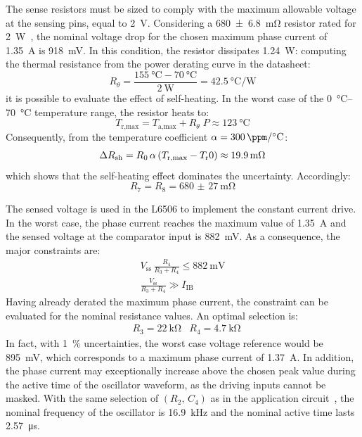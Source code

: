 \documentclass[]{article}
\begin{document}
The sense resistors must be sized to comply with the maximum allowable voltage at the sensing pins, equal to \qty{2}{\V}. Considering a \qty{680(6.8)}{\mohm} resistor rated for \qty{2}{\W}~\cite{rsense}, the nominal voltage drop for the chosen maximum phase current of \qty{1.35}{\A} is \qty{918}{\mV}. In this condition, the resistor dissipates \qty{1.24}{\W}: computing the thermal resistance from the power derating curve in the datasheet:
\[
    R_\theta = \frac{\qty{155}{\celsius}-\qty{70}{\celsius}}{\qty{2}{\W}}
             = \qty{42.5}{\celsius\per\W}
\]
it is possible to evaluate the effect of self-heating. In the worst case of the \qtyrange{0}{70}{\celsius} temperature range, the resistor heats to:
\[
    T_\text{r,max} = T_{\text{a,max}} + R_\theta\;P \approx \qty{123}{\celsius}
\]
Consequently, from the temperature coefficient $\alpha = \qty{300}{\ppm\per\celsius}$:
\[
    \Delta R_\text{sh} = R_0\,\alpha\,\pqty*{T_\text{r,max} - T_\text{r}0}
    \approx \qty{19.9}{\mohm}
\]
which shows that the self-heating effect dominates the uncertainty. Accordingly:
\[
    R_7 = R_8 = \qty{680(27)}{\mohm}
\]

The sensed voltage is used in the L6506 to implement the constant current drive. In the worst case, the phase current reaches the maximum value of \qty{1.35}{\A} and the sensed voltage at the comparator input is \qty{882}{\mV}. As a consequence, the major constraints are:
\begin{gather*}
    V_\text{ss}\,\frac{R_4}{R_3+R_4} \leq \qty{882}{\mV} \\
    \frac{V_\text{ss}}{R_3+R_4} \gg I_\text{IB}
\end{gather*}
Having already derated the maximum phase current, the constraint can be evaluated for the nominal resistance values. An optimal selection is:
\begin{align*}
    &R_3 = \qty{22}{\kohm} &R_4 = \qty{4.7}{\kohm}
\end{align*}
In fact, with \qty{1}{\percent} uncertainties, the worst case voltage reference would be \qty{895}{\mV}, which corresponds to a maximum phase current of \qty{1.37}{\A}.
In addition, the phase current may exceptionally increase above the chosen peak value during the active time of the oscillator waveform, as the driving inputs cannot be masked. With the same selection of $(R_2,\,C_4)$ as in the application circuit~\cite[5]{l6506}, the nominal frequency of the oscillator is \qty{16.9}{\kHz} and the nominal active time lasts \qty{2.57}{\micro\s}.

\clearpage
\appendix
\end{document}
